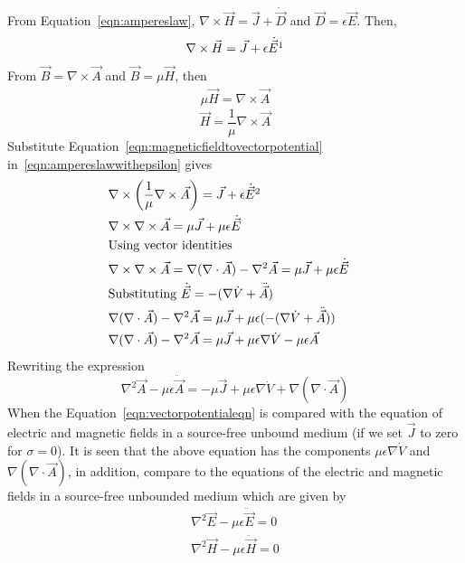 From Equation~\eqref{eqn:ampereslaw}, $\nabla\times\vec{H}=\vec{J}+\dot{\vec{D}}$
and $\vec{D}=\epsilon\vec{E}$. Then,
\begin{align}
\nabla\times\vec{H}=\vec{J}+\epsilon\dot{\vec{E}}\footnotemark
\label{eqn:ampereslawwithepsilon}
\end{align}
From $\vec{B}=\nabla\times\vec{A}$ and $\vec{B}=\mu\vec{H}$, then
\begin{align*}
\mu\vec{H}=\nabla\times\vec{A}
\end{align*}
\begin{equation}
\vec{H}=\dfrac{1}{\mu}\nabla\times\vec{A}
\label{eqn:magneticfieldtovectorpotential}
\end{equation}
Substitute Equation~\eqref{eqn:magneticfieldtovectorpotential} in~\eqref{eqn:ampereslawwithepsilon} gives
\begin{align*}
&\nabla\times\left(\dfrac{1}{\mu}\nabla\times\vec{A}\right)=\vec{J}+\epsilon\dot{\vec{E}}\footnotemark&\\
&\nabla\times\nabla\times\vec{A}=\mu\vec{J}+\mu\epsilon\dot{\vec{E}}&\\
&\text{Using vector identities}&\\
&\nabla\times\nabla\times\vec{A}=\nabla(\nabla\cdot\vec{A}) -\nabla^{2}\vec{A}=\mu\vec{J}+\mu\epsilon\dot{\vec{E}}&\\
&\text{Substituting $\dot{\vec{E}}=-(\nabla\dot{V}+\ddot{\vec{A}})$}&\\
&\nabla(\nabla\cdot\vec{A}) -\nabla^{2}\vec{A}=\mu\vec{J}+\mu\epsilon(-(\nabla\dot{V}+\ddot{\vec{A}}))&\\
&\nabla(\nabla\cdot\vec{A}) -\nabla^{2}\vec{A}=\mu\vec{J}+\mu\epsilon\nabla\dot{V}-\mu\epsilon\vec{A}&
\end{align*}
Rewriting the expression
\begin{equation}
\nabla^{2}\vec{A}-\mu\epsilon\ddot{\vec{A}}=-\mu\vec{J}+\mu\epsilon\nabla\dot{V}+\nabla(\nabla\cdot\vec{A})
\label{eqn:vectorpotentialeqn}
\end{equation}
When the Equation~\ref{eqn:vectorpotentialeqn} is compared with the equation of electric and magnetic fields in a source-free unbound medium (if we set $\vec{J}$ to zero for $\sigma=0$). It is seen that the above equation has the components $\mu\epsilon\nabla\dot{V}$ and $\nabla(\nabla\cdot\vec{A})$, in addition, compare to the equations of the electric and magnetic fields in a source-free unbounded medium which are given by
\begin{align*}
\nabla^{2}\vec{E}-\mu\epsilon\ddot{\vec{E}}=0\\
\nabla^{2}\vec{H}-\mu\epsilon\ddot{\vec{H}}=0
\end{align*}

